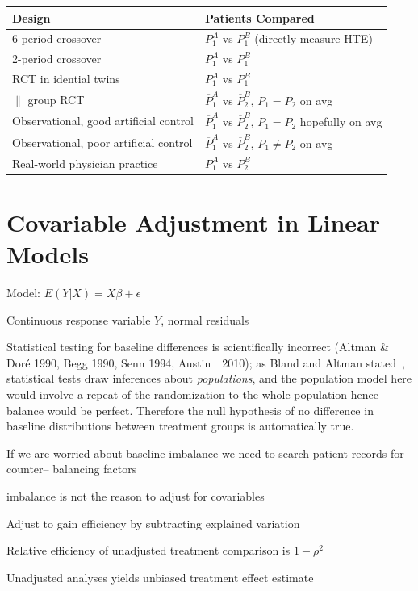 \begin{tabular}{ll}
\textbf{Design} & \textbf{Patients Compared} \\ \hline
6-period crossover & $P_{1}^{A}$ vs $P_{1}^{B}$ (directly measure HTE)\\
2-period crossover & $P_{1}^{A}$ vs $P_{1}^{B}$ \\
RCT in idential twins & $P_{1}^{A}$ vs $P_{1}^{B}$ \\
$\parallel$ group RCT & $\overline{P}_{1}^{A}$ vs $\overline{P}_{2}^{B}$, 
$P_{1}=P_{2}$ on avg \\
Observational, good artificial control & $\overline{P}_{1}^{A}$ vs 
$\overline{P}_{2}^{B}$, $P_{1}=P_{2}$ hopefully on avg\\
Observational, poor artificial control & $\overline{P}_{1}^{A}$ vs 
$\overline{P}_{2}^{B}$, $P_{1}\neq P_{2}$ on avg\\
Real-world physician practice & $P_{1}^{A}$ vs $P_{2}^{B}$ \\
 \hline
\end{tabular}


\section{Covariable Adjustment in Linear
  Models} 


\bi
\item   Model: $E(Y | X) = X \beta + \epsilon$
\item   Continuous response variable $Y$, normal residuals
\item   Statistical testing for baseline differences is scientifically incorrect (Altman \& Dor\'{e} 1990, Begg 1990, Senn 1994, Austin~\etal\ 2010); as Bland and Altman stated~\cite{bla11com}, statistical tests draw inferences about \emph{populations}, and the population model here would involve a repeat of the randomization to the whole population hence balance would be perfect.  Therefore the null hypothesis of no difference in baseline distributions between treatment groups is automatically true.
\item   If we are worried about baseline imbalance we need to search patient records for counter-- balancing factors
\item   \ra imbalance is not the reason to adjust for covariables
\item   Adjust to gain efficiency by subtracting explained variation
\item   Relative efficiency of unadjusted treatment comparison is $1-\rho^2$
\item   Unadjusted analyses yields unbiased treatment effect estimate
\ei

